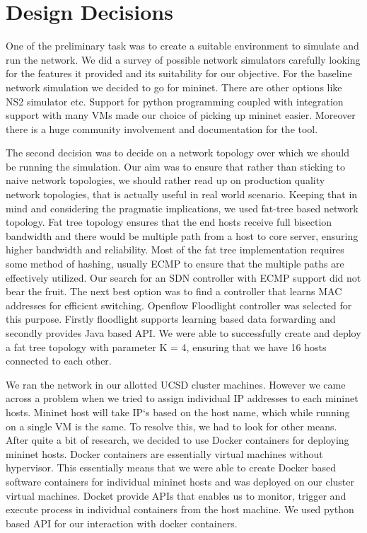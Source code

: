 \documentclass[conference]{IEEEtran}
\begin{document}

\section{Design Decisions}

One of the preliminary task was to create a suitable environment to simulate and run the network. We did a survey of possible network simulators carefully looking for the features it provided and its suitability for our objective. For the baseline network simulation we decided to go for mininet\cite{Mininet}. There are other options like NS2 simulator etc. Support for python programming coupled with integration support with many VMs made our choice of picking up mininet easier. Moreover there is a huge community involvement and documentation for the tool.

The second decision was to decide on a network topology over which we should be running the simulation. Our aim was to ensure that rather than sticking to naive network topologies, we should rather read up on production quality network topologies, that is actually useful in real world scenario. Keeping that in mind and considering the pragmatic implications, we used fat-tree based network topology. Fat tree topology ensures that the end hosts receive full bisection bandwidth and there would be multiple path from a host to core server, ensuring higher bandwidth and reliability. Most of the fat tree implementation requires some method of hashing, usually ECMP to ensure that the multiple paths are effectively utilized. Our search for an SDN controller with ECMP support did not bear the fruit. The next best option was to find a controller that learns MAC addresses for efficient switching. Openflow Floodlight\cite{Floodlight} controller was selected for this purpose. Firstly floodlight supports learning based data forwarding and secondly provides Java based API. We were able to successfully create and deploy a fat tree topology with parameter K = 4, ensuring that we have 16 hosts connected to each other.

We ran the network in our allotted UCSD cluster machines. However we came across a problem when we tried to assign individual IP addresses to each mininet hosts. Mininet host will take IP`s based on the host name, which while running on a single VM is the same. To resolve this, we had to look for other means. After quite a bit of research, we decided to use Docker\cite{Docker} containers for deploying mininet hosts. Docker containers are essentially virtual machines without hypervisor. This essentially means that we were able to create Docker based software containers for individual mininet hosts and was deployed on our cluster virtual machines. Docket provide APIs that enables us to monitor, trigger and execute process in individual containers from the host machine. We used python based API for our interaction with docker containers.
\end{document}
